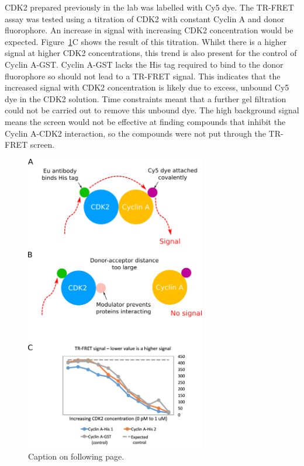 CDK2 prepared previously in the lab was labelled with Cy5 dye.
The TR-FRET assay was tested using a titration of CDK2 with constant Cyclin A and donor fluorophore.
An increase in signal with increasing CDK2 concentration would be expected.
Figure~\ref{fig:tr_fret}C shows the result of this titration.
Whilst there is a higher signal at higher CDK2 concentrations, this trend is also present for the control of Cyclin A-GST.
Cyclin A-GST lacks the His tag required to bind to the donor fluorophore so should not lead to a TR-FRET signal.
This indicates that the increased signal with CDK2 concentration is likely due to excess, unbound Cy5 dye in the CDK2 solution.
Time constraints meant that a further gel filtration could not be carried out to remove this unbound dye.
The high background signal means the screen would not be effective at finding compounds that inhibit the Cyclin A-CDK2 interaction, so the compounds were not put through the TR-FRET screen.

\begin{figure}
\centering

\includegraphics[width=0.7\textwidth]{figures/tr_fret/tr_fret}

\caption[TR-FRET assay principles and results]
{Caption on following page.}

\label{fig:tr_fret}
\end{figure}

